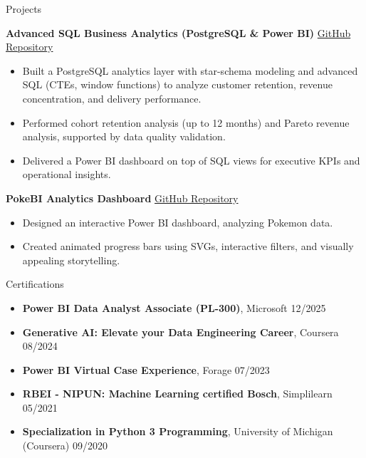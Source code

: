 \documentclass{resume} %
\begin{document}
\begin{rSection}{Projects}

\textbf{Advanced SQL Business Analytics (PostgreSQL \& Power BI)} \hfill   
\href{https://github.com/Srbhmishra18/Advanced-SQL-Business-Analytics-PostgreSQL}{GitHub Repository}  
\begin{itemize}
    \item Built a PostgreSQL analytics layer with star-schema modeling and advanced SQL (CTEs, window functions) to analyze customer retention, revenue concentration, and delivery performance.
    \item Performed cohort retention analysis (up to 12 months) and Pareto revenue analysis, supported by data quality validation.
    \item Delivered a Power BI dashboard on top of SQL views for executive KPIs and operational insights.
\end{itemize}

\textbf{PokeBI Analytics Dashboard} \hfill  
\href{https://github.com/Srbhmishra18/PokeBI-Dashboard}{GitHub Repository}  
\begin{itemize}
    \item Designed an interactive Power BI dashboard, analyzing Pokemon data.
    \item Created animated progress bars using SVGs, interactive filters, and visually appealing storytelling.
\end{itemize}

\end{rSection}

\begin{rSection}{Certifications}
\begin{itemize}
    \itemsep 4pt {}
    \item \textbf{Power BI Data Analyst Associate (PL-300)}, Microsoft \hfill 12/2025
    \item \textbf{Generative AI: Elevate your Data Engineering Career}, Coursera \hfill 08/2024
    \item \textbf{Power BI Virtual Case Experience}, Forage \hfill 07/2023
    \item \textbf{RBEI - NIPUN: Machine Learning certified Bosch}, Simplilearn \hfill 05/2021
    \item \textbf{Specialization in Python 3 Programming}, University of Michigan (Coursera) \hfill 09/2020
\end{itemize}
\end{rSection}
\end{document}
